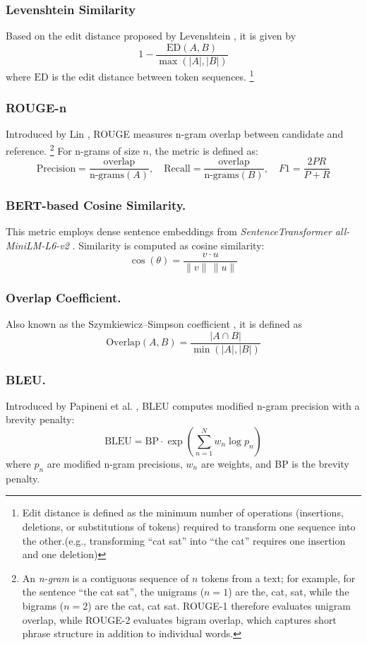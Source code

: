 \subsubsection{Levenshtein Similarity} 
Based on the edit distance proposed by Levenshtein \cite{levenshtein1966binary}, it is given by
\[
1 - \frac{\text{ED}(A,B)}{\max(|A|,|B|)}
\]
where \(\text{ED}\) is the edit distance between token sequences.  
\footnote{Edit distance is defined as the minimum number of operations (insertions, deletions, or substitutions of tokens) required to transform one sequence into the other.(e.g., transforming “cat sat” into “the cat” requires one insertion and one deletion)}

\subsubsection{ROUGE-n} 
Introduced by Lin \cite{lin2004rouge}, ROUGE measures n-gram overlap between candidate and reference. 
\footnote{An \emph{n-gram} is a contiguous sequence of \(n\) tokens from a text; for example, for the sentence ``the cat sat'', the unigrams (\(n=1\)) are {the, cat, sat}, while the bigrams (\(n=2\)) are {the cat, cat sat}.
ROUGE-1 therefore evaluates unigram overlap, while ROUGE-2 evaluates bigram overlap, which captures short phrase structure in addition to individual words. }
For n-grams of size \(n\), the metric is defined as:
\[
\text{Precision} = \frac{\text{overlap}}{\text{n-grams}(A)}, \quad
\text{Recall} = \frac{\text{overlap}}{\text{n-grams}(B)}, \quad
F1 = \frac{2PR}{P+R}
\]

\subsubsection{\gls{BERT}-based Cosine Similarity.} 
This metric employs dense sentence embeddings from \textit{SentenceTransformer all-MiniLM-L6-v2} \cite{reimers2019sentence}. 
Similarity is computed as cosine similarity:
\[
\cos(\theta) = \frac{v \cdot u}{\|v\| \, \|u\|}
\]

\subsubsection{Overlap Coefficient.} 
Also known as the Szymkiewicz--Simpson coefficient \cite{simpson1960similarity}, it is defined as
\[
\text{Overlap}(A,B) = \frac{|A \cap B|}{\min(|A|,|B|)}
\]

\subsubsection{BLEU.} 
Introduced by Papineni et al. \cite{papineni2002bleu}, BLEU computes modified n-gram precision with a brevity penalty:
\[
\text{BLEU} = \text{BP} \cdot \exp\left(\sum_{n=1}^{N} w_n \log p_n\right)
\]
where \(p_n\) are modified n-gram precisions, \(w_n\) are weights, and BP is the brevity penalty.

